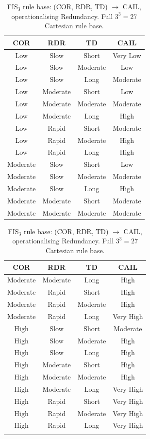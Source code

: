 \documentclass[applsci,article,submit,moreauthors,pdftex]{Definitions/mdpi}
\begin{document}
\begin{table}[!ht]
\centering\footnotesize
\setlength{\tabcolsep}{4pt}
\caption{FIS$_3$ rule base: (COR, RDR, TD) $\to$ CAIL, operationalising
Redundancy. Full $3^3 = 27$ Cartesian rule base.}
\label{tab:rules-fis3}
\begin{minipage}[t]{0.48\textwidth}\centering
\begin{tabular}{cccc}
\toprule
COR & RDR & TD & CAIL \\
\midrule
Low & Slow & Short & Very Low \\
Low & Slow & Moderate & Low \\
Low & Slow & Long & Moderate \\
Low & Moderate & Short & Low \\
Low & Moderate & Moderate & Moderate \\
Low & Moderate & Long & High \\
Low & Rapid & Short & Moderate \\
Low & Rapid & Moderate & High \\
Low & Rapid & Long & High \\
Moderate & Slow & Short & Low \\
Moderate & Slow & Moderate & Moderate \\
Moderate & Slow & Long & High \\
Moderate & Moderate & Short & Moderate \\
Moderate & Moderate & Moderate & Moderate \\
\bottomrule
\end{tabular}
\end{minipage}\hfill
\begin{minipage}[t]{0.48\textwidth}\centering
\begin{tabular}{cccc}
\toprule
COR & RDR & TD & CAIL \\
\midrule
Moderate & Moderate & Long & High \\
Moderate & Rapid & Short & High \\
Moderate & Rapid & Moderate & High \\
Moderate & Rapid & Long & Very High \\
High & Slow & Short & Moderate \\
High & Slow & Moderate & High \\
High & Slow & Long & High \\
High & Moderate & Short & High \\
High & Moderate & Moderate & High \\
High & Moderate & Long & Very High \\
High & Rapid & Short & Very High \\
High & Rapid & Moderate & Very High \\
High & Rapid & Long & Very High \\
& & & \\
\bottomrule
\end{tabular}
\end{minipage}
\end{table}
\end{document}
